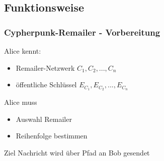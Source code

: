 \documentclass{beamer}
\begin{document}
\subsection{Funktionsweise}
\begin{frame}
	\frametitle{Cypherpunk-Remailer - Vorbereitung}
	\begin{block}{Alice kennt:}
		\begin{itemize}
			\item Remailer-Netzwerk \(C_1, C_2, ..., C_n\)
			\item öffentliche Schlüssel \(E_{C_1}, E_{C_2}, ..., E_{C_n}\)
		\end{itemize}	
	\end{block}

	\begin{block}{Alice muss}
	\begin{itemize}
		\item Auswahl Remailer
		\item Reihenfolge bestimmen
	\end{itemize}	
	\end{block}

	\begin{exampleblock}{Ziel}
		Nachricht wird über Pfad an Bob gesendet
	\end{exampleblock}	
\end{frame}
\end{document}
